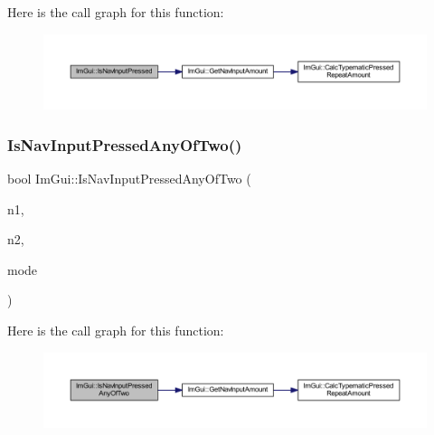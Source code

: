 Here is the call graph for this function\+:
\nopagebreak
\begin{figure}[H]
\begin{center}
\leavevmode
\includegraphics[width=350pt]{namespace_im_gui_a1ad1c0c31f7299147da51093baa1663e_cgraph}
\end{center}
\end{figure}
\mbox{\label{namespace_im_gui_a9e235473624d8c3c1539add6df8bf032}} 
\subsubsection{\texorpdfstring{Is\+Nav\+Input\+Pressed\+Any\+Of\+Two()}{IsNavInputPressedAnyOfTwo()}}
{\footnotesize\ttfamily bool Im\+Gui\+::\+Is\+Nav\+Input\+Pressed\+Any\+Of\+Two (\begin{DoxyParamCaption}\item[{\mbox{\hyperlink{imgui_8h_a8334d2b3901efd9820b64e2413967469}{Im\+Gui\+Nav\+Input}}}]{n1,  }\item[{\mbox{\hyperlink{imgui_8h_a8334d2b3901efd9820b64e2413967469}{Im\+Gui\+Nav\+Input}}}]{n2,  }\item[{\mbox{\hyperlink{imgui__internal_8h_a595aad51728e2685daff714edb3d05fd}{Im\+Gui\+Input\+Read\+Mode}}}]{mode }\end{DoxyParamCaption})\hspace{0.3cm}{\ttfamily [inline]}}

Here is the call graph for this function\+:
\nopagebreak
\begin{figure}[H]
\begin{center}
\leavevmode
\includegraphics[width=350pt]{namespace_im_gui_a9e235473624d8c3c1539add6df8bf032_cgraph}
\end{center}
\end{figure}
\mbox{\label{namespace_im_gui_a8f25c1565fca7cb9796c54e5cebc44ee}} 
